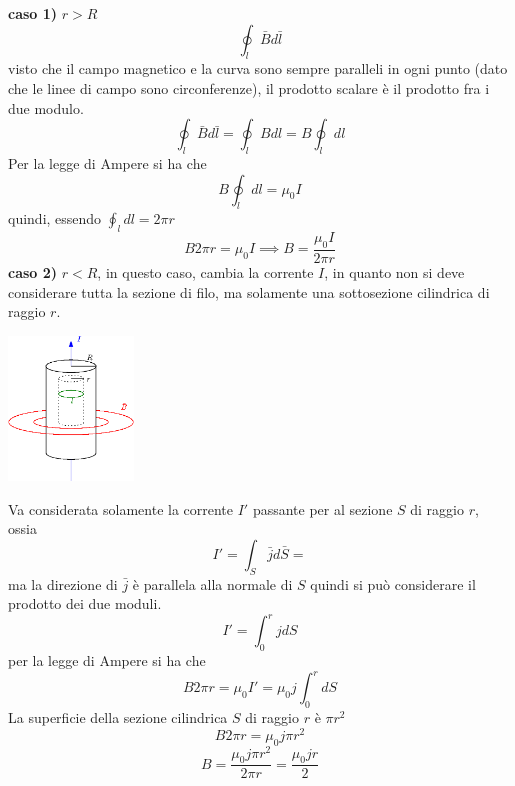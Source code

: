 \documentclass[10pt, letterpaper]{report}
\begin{document}
\textbf{caso 1)} $r>R$ 
$$ \oint_l \bar B d\bar l  $$
visto che il campo magnetico  e la curva sono sempre paralleli in ogni punto (dato che le linee di campo sono circonferenze), il prodotto scalare è il prodotto fra i due modulo.
$$ \oint_l \bar B d\bar l  =\oint_l Bdl=B\oint_l dl$$
Per la legge di Ampere si ha che 
$$ B\oint_l dl=\mu_0I$$
quindi, essendo $\oint_l dl=2\pi r$
$$B2\pi r = \mu_0I\implies B = \frac{\mu_0I}{2\pi r} $$
\textbf{caso 2)} $r<R$, in questo caso, cambia la corrente $I$, in quanto non si deve considerare tutta la sezione di filo, ma solamente una sottosezione cilindrica di raggio $r$.
\begin{center}
    \includegraphics[width=0.25\textwidth ]{images/cilindroElettrico2.eps}
\end{center}
Va considerata solamente la corrente $I'$ passante per al sezione $S$ di raggio $r$, ossia $$I'=\int_S \bar j d\bar S =$$ 
ma la direzione di $\bar j$ è parallela alla normale di $S$ quindi si può considerare il prodotto dei due moduli.
$$ I'=\int_0^r jdS$$ per la legge di Ampere si ha che 
$$B2\pi r = \mu_0 I' =  \mu_0 j\int_0^r dS$$
La superficie della sezione cilindrica $S$ di raggio $r$ è $\pi r^2$
$$B2\pi r=\mu_0j\pi r^2 $$
$$ B=\frac{\mu_0j\pi r^2}{2\pi r}=\frac{\mu_0j r}{2 }$$
\end{document}
